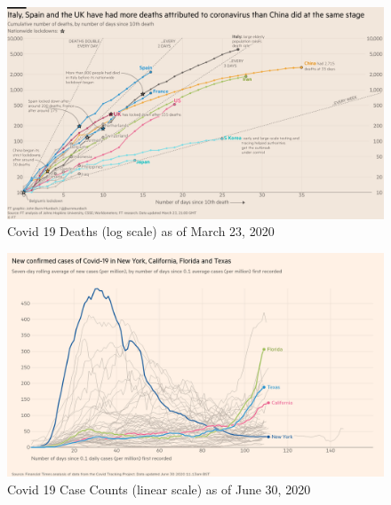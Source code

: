 \documentclass[print]{nuthesis}
\begin{document}
\begin{figure}[tbp]

{\centering \includegraphics[width=0.9\linewidth,]{images/covid19-FT-03.23.2020-log} 

}

\caption{Covid 19 Deaths (log scale) as of March 23, 2020}\label{fig:covid19-FT-deaths-march2020-log}
\end{figure}

\begin{figure}[tbp]

{\centering \includegraphics[width=0.9\linewidth,]{images/covid19-FT-case-count-06.30.2020-linear} 

}

\caption{Covid 19 Case Counts (linear scale) as of June 30, 2020}\label{fig:covid19-FT-june2020-case-counts-linear}
\end{figure}
\end{document}
